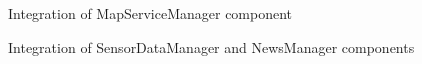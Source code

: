 \documentclass[table, 12pt]{article}
\begin{document}
\begin{figure}[H]
    \caption{Integration of MapServiceManager component}%
    \label{fig: integration_MapServiceManager_WeatherManager}%
\end{figure}

\begin{figure}[H]
    \centering
    \qquad\qquad
    \caption{Integration of SensorDataManager and NewsManager components}%
    \label{fig: integration_SensorDataManager_NewsManager}%
\end{figure}
\end{document}
